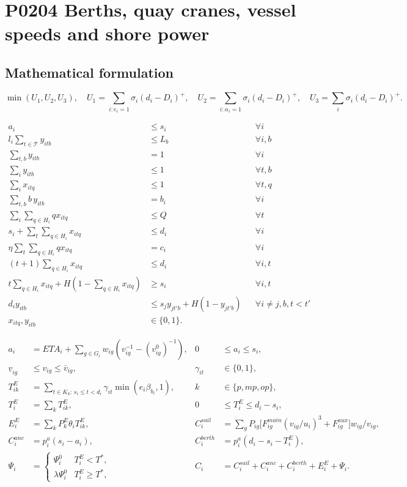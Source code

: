 \documentclass[10pt]{article}
\begin{document}
\section*{P0204 Berths, quay cranes, vessel speeds and shore power}
\subsection*{Mathematical formulation}
\[
\min(U_1,U_2,U_3),\quad
U_1=\sum_{i:e_i=1}\sigma_i(d_i-D_i)^+,\quad
U_2=\sum_{i:\alpha_i=1}\sigma_i(d_i-D_i)^+,\quad
U_3=\sum_i\sigma_i(d_i-D_i)^+.
\]

\begin{align}
a_i&\le s_i &&\forall i \tag{4}\\
l_i\sum_{t\in\mathcal T}y_{itb}&\le L_b &&\forall i,b \tag{5}\\
\sum_{t,b}y_{itb}&=1 &&\forall i \tag{6}\\
\sum_i y_{itb}&\le1 &&\forall t,b \tag{7}\\
\sum_i x_{itq}&\le1 &&\forall t,q \tag{8}\\
\sum_{t,b}b\,y_{itb}&=b_i &&\forall i \tag{9}\\
\sum_i\sum_{q\in H_i}q x_{itq}&\le Q &&\forall t \tag{10}\\
s_i+\sum_t\sum_{q\in H_i}x_{itq}&\le d_i &&\forall i \tag{11}\\
\eta\sum_t\sum_{q\in H_i}q x_{itq}&=c_i &&\forall i \tag{12}\\
(t+1)\sum_{q\in H_i}x_{itq}&\le d_i &&\forall i,t \tag{13}\\
t\sum_{q\in H_i}x_{itq}+H(1-\sum_{q\in H_i}x_{itq})&\ge s_i &&\forall i,t \tag{14}\\
d_i y_{itb}&\le s_j y_{jt'b}+H(1-y_{jt'b})
&&\forall i\ne j,b,t<t' \tag{15}\\
x_{itq},y_{itb}&\in\{0,1\}. && \tag{16}
\end{align}

\begin{align*}
a_i&=ETA_i+\sum_{g\in G_i}w_{ig}(v_{ig}^{-1}-(v^0_{ig})^{-1}),&
0&\le a_i\le s_i,\\
\underline v_{ig}&\le v_{ig}\le\bar v_{ig},&
\gamma_{it}&\in\{0,1\},\\
T_{ik}^E&=\sum_{t\in K_k:\,s_i\le t<d_i}
             \gamma_{it}\min(e_i\beta_{b_i},1),&
k&\in\{p,mp,op\},\\
T_i^E&=\sum_kT_{ik}^E,&
0&\le T_i^E\le d_i-s_i,\\
E_i^E&=\sum_k P_k^E\theta_i T_{ik}^E,&
C_i^{sail}&=\sum_gP_{ig}\big[F^{main}_{ig}(v_{ig}/u_i)^3+F^{aux}_{ig}\big]w_{ig}/v_{ig},\\
C_i^{anc}&=p_i^a(s_i-a_i),&
C_i^{berth}&=p_i^a(d_i-s_i-T_i^E),\\
\Psi_i&=\begin{cases}\Psi_i^0&T_i^E<T^*,\\
\lambda\Psi_i^0&T_i^E\ge T^*,\end{cases}&
C_i&=C_i^{sail}+C_i^{anc}+C_i^{berth}+E_i^E+\Psi_i.
\end{align*}
\end{document}
